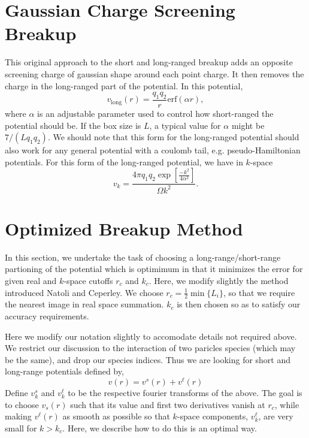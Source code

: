 \documentclass{article}
\begin{document}
\section{Gaussian Charge Screening Breakup}
This original approach to the short and long-ranged breakup adds an
opposite screening charge of gaussian shape around each point charge.
It then removes the charge in the long-ranged part of the potential.
In this potential,
\begin{equation}
v_{\text{long}}(r) = \frac{q_1 q_2}{r} \text{erf}(\alpha r),
\end{equation}
where $\alpha$ is an adjustable parameter used to control how
short-ranged the potential should be.  If the box size is $L$, a
typical value for $\alpha$ might be $7/(Lq_1 q_2)$. We should note
that this form for the long-ranged potential should also work for any
general potential with a coulomb tail, e.g. pseudo-Hamiltonian
potentials.  For this form of the long-ranged potential, we have in $k$-space
\begin{equation}
v_k = \frac{4\pi q_1 q_2 \exp\left[\frac{-k^2}{4\alpha^2}\right]}{\Omega k^2}.
\end{equation}

\section{Optimized Breakup Method}
In this section, we undertake the task of choosing a
long-range/short-range partioning of the potential which is optimimum
in that it minimizes the error for given real and $k$-space cutoffs
$r_c$ and $k_c$.  Here, we modify slightly the method introduced
Natoli and Ceperley\cite{Natoli}. We choose $r_c =
\frac{1}{2}\min\{L_i\}$, so that we require the nearest image in
real space summation.  $k_c$ is then chosen so as to satisfy our
accuracy requirements.

Here we modify our notation slightly to accomodate details not
required above.  We restrict our discussion to the interaction of two
paricles species (which may be the same), and drop our species
indices.  Thus we are looking for short and long-range potentials
defined by,
\newcommand{\vs}{v^s}
\newcommand{\vl}{v^\ell}
\begin{equation}
v(r) = \vs(r) + \vl(r)
\end{equation}
Define $\vs_k$ and $\vl_k$ to be the respective fourier transforms of
the above.  The goal is to choose $v_s(r)$ such that its value and
first two derivatives vanish at $r_c$, while making $\vl(r)$ as smooth as
possible so that $k$-space components, $\vl_k$, are very small for
$k>k_c$.  Here, we describe how to do this is an optimal way.
\end{document}
